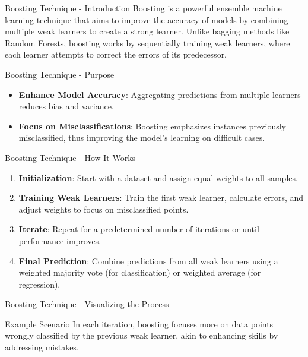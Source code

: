 \documentclass[aspectratio=169]{beamer}
\begin{document}
\begin{frame}[fragile]{Boosting Technique - Introduction}
    Boosting is a powerful ensemble machine learning technique that aims to improve the accuracy of models by combining multiple weak learners to create a strong learner. Unlike bagging methods like Random Forests, boosting works by sequentially training weak learners, where each learner attempts to correct the errors of its predecessor.
\end{frame}

\begin{frame}[fragile]{Boosting Technique - Purpose}
    \begin{itemize}
        \item \textbf{Enhance Model Accuracy}: Aggregating predictions from multiple learners reduces bias and variance.
        \item \textbf{Focus on Misclassifications}: Boosting emphasizes instances previously misclassified, thus improving the model’s learning on difficult cases.
    \end{itemize}
\end{frame}

\begin{frame}[fragile]{Boosting Technique - How It Works}
    \begin{enumerate}
        \item \textbf{Initialization}: Start with a dataset and assign equal weights to all samples.
        \item \textbf{Training Weak Learners}: Train the first weak learner, calculate errors, and adjust weights to focus on misclassified points.
        \item \textbf{Iterate}: Repeat for a predetermined number of iterations or until performance improves.
        \item \textbf{Final Prediction}: Combine predictions from all weak learners using a weighted majority vote (for classification) or weighted average (for regression).
    \end{enumerate}
\end{frame}

\begin{frame}[fragile]{Boosting Technique - Visualizing the Process}
    \begin{block}{Example Scenario}
        In each iteration, boosting focuses more on data points wrongly classified by the previous weak learner, akin to enhancing skills by addressing mistakes. 
    \end{block}
\end{frame}
\end{document}

